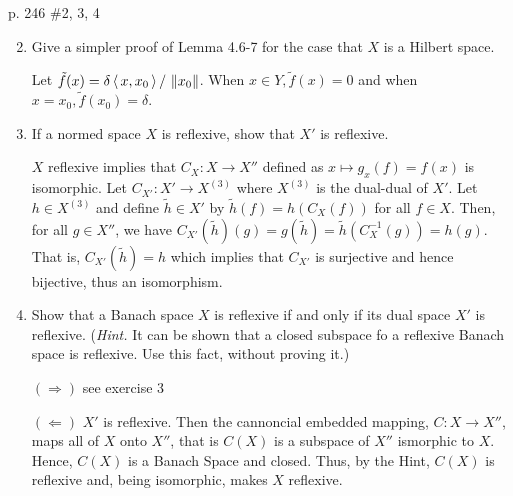 \documentclass[10pt,a4paper]{report}
\newcommand{\NORM}[1]{\,\left \Vert #1 \right \Vert}
\begin{document}
\newpage p. 246 \#2, 3, 4 
\begin{enumerate}
	\setcounter{enumi}{1}
	\item Give a simpler proof of Lemma 4.6-7 for the case that $X$ is a Hilbert space.
	
	Let $\tilde{f}(x) = \delta\ABRACKET{x, x_0}/\NORM{x_0}$.  When $x \in Y, \tilde{f}(x) = 0$ and when $x = x_0, \tilde{f}(x_0) = \delta$.  
	
	\item If a normed space $X$ is reflexive, show that $X'$ is reflexive. 
	
	$X$ reflexive implies that $C_X: X \to X''$ defined as $x \mapsto g_x(f)=f(x)$ is isomorphic.  Let $C_{X'}: X' \to X^{(3)}$ where $X^{(3)}$ is the dual-dual of $X'$.  Let $h \in X^{(3)}$	and define $\tilde{h} \in X'$ by $\tilde{h}(f) = h(C_X(f))$ for all $f \in X$.  Then, for all $g \in X''$, we have $C_{X'}(\tilde{h})(g)= g(\tilde{h})= \tilde{h}(C_X^{-1}(g))=h(g)$.  That is, $C_{X'}(\tilde{h}) = h$ which implies that $C_{X'}$ is surjective and hence bijective, thus an isomorphism.
	
	\item Show that a Banach space $X$ is reflexive if and only if its dual space $X'$ is reflexive.  (\textit{Hint.}  It can be shown that a closed subspace fo a reflexive Banach space is reflexive.  Use this fact, without proving it.)
	
	$(\Rightarrow)$ see exercise 3 
	
	$(\Leftarrow)$ $X'$ is reflexive.  Then the cannoncial embedded mapping, $C: X \to X''$, maps all of $X$ onto $X''$, that is $C(X)$ is a subspace of $X''$ ismorphic to $X$.  Hence, $C(X)$ is a Banach Space and closed.  Thus, by the Hint, $C(X)$ is reflexive and, being isomorphic, makes $X$ reflexive.
\end{enumerate}
\end{document}
